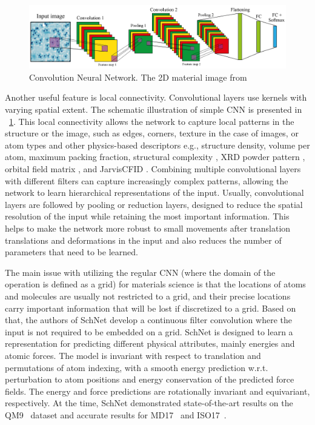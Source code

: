 \begin{figure}[H]
    \noindent
    \centering
    \includegraphics[width=13.6cm]{figures/CNN.png}
    \caption{Convolution Neural Network. The 2D material image from \cite{li2021ordered}}
    \label{fig:cnn}
\end{figure}

Another useful feature is local connectivity. Convolutional layers use kernels with varying spatial extent. The schematic illustration of simple CNN is presented in ~\ref{fig:cnn}. This local connectivity allows the network to capture local patterns in the structure or the image, such as edges, corners, texture in the case of images, or atom types and other physics-based descriptors e.g., structure density, volume per atom, maximum packing fraction, structural complexity \cite{PhysRevMaterials.2.083801}, XRD powder pattern \cite{LamPham2017}, orbital field matrix \cite{Ong2013}, and JarvisCFID \cite{ complexity2013}. Combining multiple convolutional layers with different filters can capture increasingly complex patterns, allowing the network to learn hierarchical representations of the input. Usually, convolutional layers are followed by pooling or reduction layers, designed to reduce the spatial resolution of the input while retaining the most important information. This helps to make the network more robust to small movements after translation translations and deformations in the input and also reduces the number of parameters that need to be learned.

The main issue with utilizing the regular CNN (where the domain of the operation is defined as a grid) for materials science is that the locations of atoms and molecules are usually not restricted to a grid, and their precise locations carry important information that will be lost if discretized to a grid. Based on that, the authors of SchNet \cite{schutt2017schnet} develop a continuous filter convolution where the input is not required to be embedded on a grid. SchNet is designed to learn a representation for predicting different physical attributes, mainly energies and atomic forces. The model is invariant with respect to translation and permutations of atom indexing, with a smooth energy prediction w.r.t. perturbation to atom positions and energy conservation of the predicted force fields. The energy and force predictions are rotationally invariant and equivariant, respectively. At the time, SchNet demonstrated state-of-the-art results on the QM9~\cite{ruddigkeit2012enumeration,ramakrishnan2014quantum} dataset and accurate results for MD17~\cite{chmiela2017machine} and ISO17~\cite{schutt2017schnet}.

